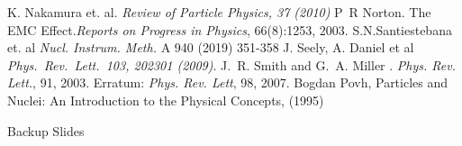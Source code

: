 \documentclass[12pt,usenames,dvipsnames]{beamer}
\newcommand{\backupbegin}{
	\newcounter{finalframe}
	\setcounter{finalframe}{\value{framenumber}}
}
\begin{document}
\begin{frame}[allowframebreaks]
{\begin{thebibliography}{9}
\vspace*{-8pt}		
		 K. Nakamura et. al.
		\newblock \emph{Review of Particle Physics, 37 (2010) }	
\vspace*{-8pt}
		 P~R Norton.
\newblock The EMC Effect.{\em Reports on Progress in Physics}, 66(8):1253, 2003.
\vspace*{-8pt}		
		 S.N.Santiestebana et. al 
		\newblock 	\emph{Nucl. Instrum. Meth.} A 940 (2019) 351-358
\vspace*{-8pt}				
		 J. Seely, A. Daniel et al  
		\newblock \emph{Phys.\ Rev.\ Lett.\   103, 202301 (2009)}.
\vspace*{-8pt}
		 J.~R. Smith and G.~A. Miller
.
{\em Phys. Rev. Lett.}, 91, 2003. Erratum: {\em Phys. Rev. Lett}, 98, 2007.
\vspace*{-8pt}				
		 Bogdan Povh,
		\newblock Particles and Nuclei: An Introduction to the Physical Concepts, (1995)
			
	


		 

		 



	\end{thebibliography}
}
\end{frame}

\backupbegin
\begin{frame}
\centering
\LARGE{Backup Slides}

\end{frame}
\end{document}
